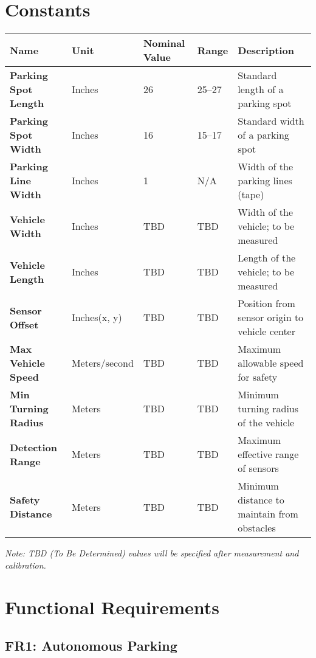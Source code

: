 \documentclass[12pt]{article}
\begin{document}
\section{Constants}


\small %
\begin{longtable}{p{3.5cm}p{2cm}p{2cm}p{2cm}p{4cm}}
\toprule
\textbf{Name} & \textbf{Unit} & \textbf{Nominal Value} & \textbf{Range} & \textbf{Description} \\
\midrule
\endhead
\textbf{Parking Spot Length} & Inches & 26 & 25--27 & Standard length of a parking spot \\
\textbf{Parking Spot Width} & Inches & 16 & 15--17 & Standard width of a parking spot \\
\textbf{Parking Line Width} & Inches & 1 & N/A & Width of the parking lines (tape) \\
\textbf{Vehicle Width} & Inches & TBD & TBD & Width of the vehicle; to be measured \\
\textbf{Vehicle Length} & Inches & TBD & TBD & Length of the vehicle; to be measured \\
\textbf{Sensor Offset} & Inches(x, y) & TBD & TBD & Position from sensor origin to vehicle center \\
\textbf{Max Vehicle Speed} & Meters/second & TBD & TBD & Maximum allowable speed for safety \\
\textbf{Min Turning Radius} & Meters & TBD & TBD & Minimum turning radius of the vehicle \\
\textbf{Detection Range} & Meters & TBD & TBD & Maximum effective range of sensors \\
\textbf{Safety Distance} & Meters & TBD & TBD & Minimum distance to maintain from obstacles \\
\bottomrule
\end{longtable}
\normalsize %



\textit{Note: TBD (To Be Determined) values will be specified after measurement and calibration.}

\section{Functional Requirements}

\subsection*{FR1: Autonomous Parking}
\end{document}
